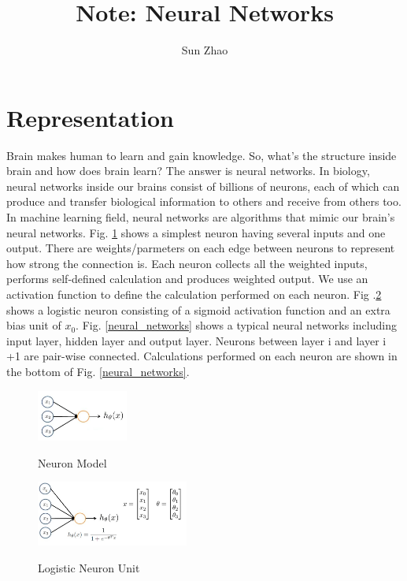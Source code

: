 \documentclass{article}
\title{Note: Neural Networks}
\author{Sun Zhao}
\begin{document}
\maketitle
\newpage

\section{Representation}
Brain makes human to learn and gain knowledge. So, what's the structure inside brain and how does brain learn? The answer is neural networks. In biology, neural networks inside our brains consist of billions of neurons, each of which can produce and transfer biological information to others and receive from others too. In machine learning field, neural networks are algorithms that mimic our brain's neural networks. Fig. \ref{neuron_model} shows a simplest neuron having several inputs and one output. There are weights/parmeters on each edge between neurons to represent how strong the connection is. Each neuron collects all the weighted inputs, performs self-defined calculation and produces weighted output. We use an activation function to define the calculation performed on each neuron. Fig .\ref{logistic_neuron_unit} shows a logistic neuron consisting of a sigmoid activation function and an extra bias unit of $x_{0}$. Fig. \ref{neural_networks} shows a typical neural networks including input layer, hidden layer and output layer. Neurons between layer i and layer i +1 are pair-wise connected. Calculations performed on each neuron are shown in the bottom of Fig. \ref{neural_networks}.
\begin{figure}[ht]
  \centering
  \includegraphics[width=3cm]{Figure1.jpg}\\
  \caption{Neuron Model}\label{neuron_model}
\end{figure}
\begin{figure}[ht]
  \centering
  \includegraphics[width=5cm]{Figure2.jpg}\\
  \caption{Logistic Neuron Unit}\label{logistic_neuron_unit}
\end{figure}
\end{document}
